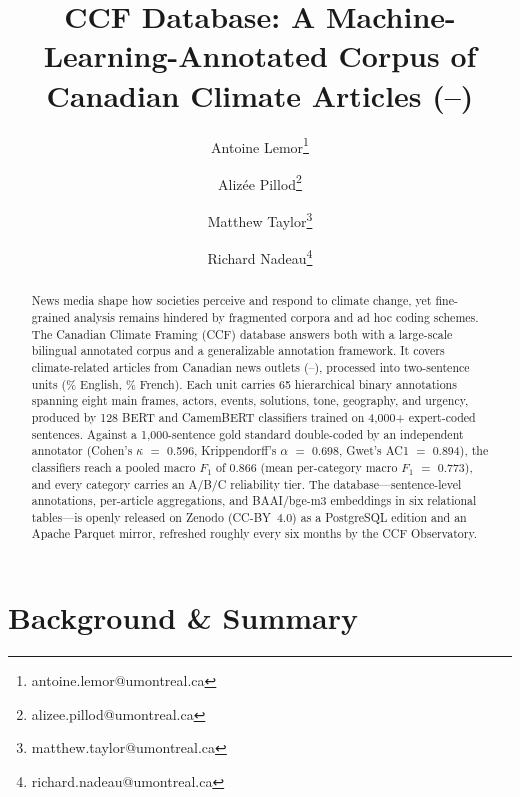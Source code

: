 \documentclass[12pt]{article}
\title{\textbf{CCF Database: A Machine-Learning-Annotated Corpus of \CCFarticles{} Canadian Climate Articles (\CCFyearfirst{}--\CCFyearlast{})}}
\author[1]{Antoine Lemor\thanks{antoine.lemor@umontreal.ca}}
\author[2]{Alizée Pillod\thanks{alizee.pillod@umontreal.ca}}
\author[2]{Matthew Taylor\thanks{matthew.taylor@umontreal.ca}}
\author[2]{Richard Nadeau\thanks{richard.nadeau@umontreal.ca}}
\affil[1]{Université de Sherbrooke, Sherbrooke, Québec, Canada}
\affil[2]{Université de Montréal, Montréal, Québec, Canada}
\date{}
\renewcommand\_{\texttt{\detokenize{_}\allowbreak}}
\begin{document}
\maketitle
\thispagestyle{empty}


\begin{abstract}
\noindent
News media shape how societies perceive and respond to climate change, yet fine-grained analysis remains hindered by fragmented corpora and ad hoc coding schemes. The Canadian Climate Framing (CCF) database answers both with a large-scale bilingual annotated corpus and a generalizable annotation framework. It covers \CCFarticles{} climate-related articles from \CCFnewspapers{} Canadian news outlets (\CCFyearfirst{}--\CCFyearlast{}), processed into \CCFsentences{} two-sentence units (\CCFenshare{}\% English, \CCFfrshare{}\% French). Each unit carries 65 hierarchical binary annotations spanning eight main frames, actors, events, solutions, tone, geography, and urgency, produced by 128 BERT and CamemBERT classifiers trained on 4{,}000+ expert-coded sentences. Against a 1{,}000-sentence gold standard double-coded by an independent annotator (Cohen's $\kappa$ $=$ 0.596, Krippendorff's $\alpha$ $=$ 0.698, Gwet's AC1 $=$ 0.894), the classifiers reach a pooled macro $F_1$ of 0.866 (mean per-category macro $F_1$ $=$ 0.773), and every category carries an A/B/C reliability tier. The database---sentence-level annotations, per-article aggregations, and \CCFembeddings{} BAAI/bge-m3 embeddings in six relational tables---is openly released on Zenodo (CC-BY~4.0) as a PostgreSQL edition and an Apache Parquet mirror, refreshed roughly every six months by the CCF Observatory.
\end{abstract}

\newpage

\section{Background \& Summary}
\end{document}
